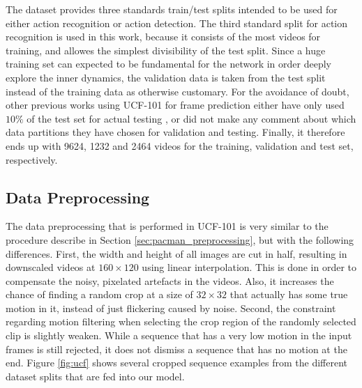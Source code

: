 The dataset provides three standards train/test splits intended to be used for either action recognition or action detection. The third standard split for action recognition is used in this work, because it consists of the most videos for training, and allowes the simplest divisibility of the test split. Since a huge training set can expected to be fundamental for the network in order deeply explore the inner dynamics, the validation data is taken from the test split instead of the training data as otherwise customary. For the avoidance of doubt, other previous works using UCF-101 for frame prediction either have only used $ 10\% $ of the test set for actual testing \parencite[p. 12]{deep_multiscale_video_pred}, or did not make any comment about which data partitions they have chosen for validation and testing. Finally, it therefore ends up with \num{9624}, \num{1232} and \num{2464} videos for the training, validation and test set, respectively.


\subsection{Data Preprocessing}

The data preprocessing that is performed in UCF-101 is very similar to the procedure describe in Section \ref{sec:pacman_preprocessing}, but with the following differences. First, the width and height of all images are cut in half, resulting in downscaled videos at $160 \times 120$ using linear interpolation. This is done in order to compensate the noisy, pixelated artefacts in the videos. Also, it increases the chance of finding a random crop at a size of $ 32 \times 32 $ that actually has some true motion in it, instead of just flickering caused by noise. Second, the constraint regarding motion filtering when selecting the crop region of the randomly selected clip is slightly weaken. While a sequence that has a very low motion in the input frames is still rejected, it does not dismiss a sequence that has no motion at the end. Figure \ref{fig:ucf} shows several cropped sequence examples from the different dataset splits that are fed into our model.

